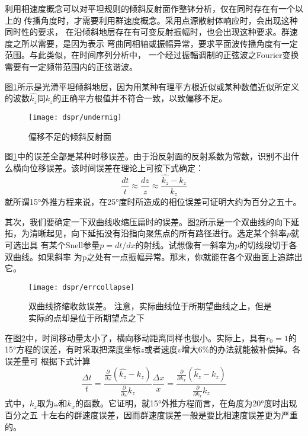 利用相速度概念可以对平坦规则的倾斜反射面作整钵分析，仅在同时存在有一个以上的
传播角度时，才需要利用群速度概念。采用点源散射体响应时，会出现这种同时性的要求，
在沿倾斜地层存在有可变反射振幅时，也会出现这种要求。群速度之所以需要，是因为表示
弯曲同相轴或振幅异常，要求平面波传播角度有一定范围。与此类似，在时间序列分析中，
一个经过振輻调制的正弦波之Fourier变换需要有一定频带范围内的正弦谐波。

图\ref{fig:dspr/undermig}所示是光滑平坦倾斜地层，因为用某种有理平方根近似或某种数值近似所定义
的波数$\hat{k_z}$同$k_z$的正确平方根值并不符合一致，以致偏移不足。

\begin{figure}[H]
\centering
\texttt{[image: dspr/undermig]}
\caption[undermig]{偏移不足的倾斜反射面}
\label{fig:dspr/undermig}
\end{figure}

图\ref{fig:dspr/undermig}中的误差全部是某种时移误差。由于沿反射面的反射系数为常数，识别不出什
么横向位移误差。该时间误差在理论上可按下式确定：
\begin{equation}
\frac{dt}{t}\approx\frac{dz}{z}\approx\frac{\hat{k_z}-k_z}{k_z}
\label{eq.ex4.2.2}
\end{equation}
就所谓15°外推方程来说，在25°度时所造成的相位误差可证明大约为百分之五十。

其次，我们要确定一下双曲线收缩压扁时的误差。图\ref{fig:dspr/errcollapse}所示是一个双曲线的向下延
拓，为清晰起见，向下延拓没有沿指向聚焦点的所有路径进行。选定某个斜率$p$就可选出具
有某个Snell参量$p=dt/dx$的射线。试想像有一斜率为$p$的切线段切于各双曲线。如果斜率
为p之处有一点振幅异常。那末，你就能在各个双曲面上追踪出它。

\begin{figure}[H]
\centering
\texttt{[image: dspr/errcollapse]}
\caption[errcollapse]{双曲线挤缩收敛误差。
注意，实际曲线位于所期望曲线之上，但是
实际的点却是位于所期望点之下}
\label{fig:dspr/errcollapse}
\end{figure}

在图\ref{fig:dspr/errcollapse}中，时间移动量太小了，横向移动距离同样也很小。实际上，具有$r_0=1$的
15°方程的误差，有时采取把深度坐标$z$或者速度$v$增大6\%的办法就能被补偿掉。各误差量可
根据下式计算
\begin{subequations}
\begin{equation}
\frac{\Delta t}{t}=\frac{\frac{\partial}{\partial \omega}(\hat{k_z}-k_z)}{\frac{\partial}{\partial \omega}k_z}
\label{eq:ex4.2.3a}
\end{equation}
\begin{equation}
\frac{\Delta x}{x}=\frac{\frac{\partial}{\partial k_x}(\hat{k_z}-k_z)}{\frac{\partial}{\partial k_x}k_z}
\label{eq:ex4.2.3b}
\end{equation}
\end{subequations}
式中，$k_z$取为$\omega$和$k_x$的函数。它证明，就15°外推方程而言，在角度为20°度时出现百分之五
十左右的群速度误差，因而群速度误差一般是要比相速度误差更为严重的。

